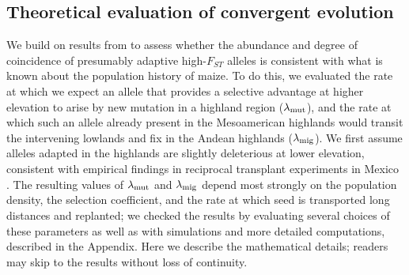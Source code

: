 \subsection*{Theoretical evaluation of convergent evolution }
We build on results from \cite{ralph2014convergent} to assess whether the abundance and degree of coincidence of presumably adaptive high-$F_{ST}$ alleles is consistent with what is known about the population history of maize.
To do this,
we evaluated the rate at which we expect an allele that provides a selective advantage at higher elevation to arise by new mutation in a highland region ($\lambda_{\text{mut}}$), and the rate at which such an allele already present in the Mesoamerican highlands would transit the intervening lowlands and fix in the Andean highlands ($\lambda_{\text{mig}}$).
We first assume alleles adapted in the highlands are slightly deleterious at lower elevation, consistent with empirical findings in reciprocal transplant experiments in Mexico \cite[]{Mercer2008}.
The resulting values of $\lambda_{\text{mut}}$ and $\lambda_{\text{mig}}$ 
depend most strongly on the population density, the selection coefficient, and the rate at which seed is transported long distances and replanted;
we checked the results by evaluating several choices of these parameters
as well as with simulations and more detailed computations, described in the Appendix.
Here we describe the mathematical details; readers may skip to the results without loss of continuity.

